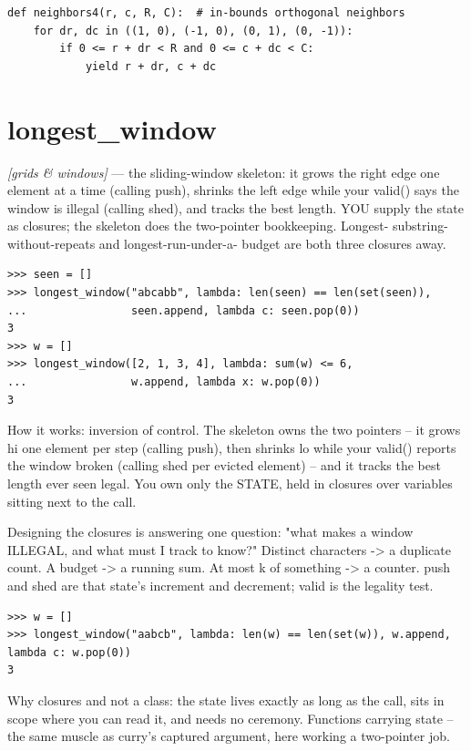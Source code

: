 \documentclass[11pt,letterpaper]{book}
\begin{document}
\begin{lstlisting}[style=code]
def neighbors4(r, c, R, C):  # in-bounds orthogonal neighbors
    for dr, dc in ((1, 0), (-1, 0), (0, 1), (0, -1)):
        if 0 <= r + dr < R and 0 <= c + dc < C:
            yield r + dr, c + dc
\end{lstlisting}

\section{longest\_window}
\noindent\textit{[grids \& windows]} --- the sliding-window skeleton: it grows the right edge one element at a time (calling push), shrinks the left edge while your valid() says the window is illegal (calling shed), and tracks the best length. YOU supply the state as closures; the skeleton does the two-pointer bookkeeping. Longest- substring-without-repeats and longest-run-under-a- budget are both three closures away.
\begin{lstlisting}[style=spec]
>>> seen = []
>>> longest_window("abcabb", lambda: len(seen) == len(set(seen)),
...                seen.append, lambda c: seen.pop(0))
3
>>> w = []
>>> longest_window([2, 1, 3, 4], lambda: sum(w) <= 6,
...                w.append, lambda x: w.pop(0))
3
\end{lstlisting}

How it works: inversion of control. The skeleton owns the two pointers -- it grows hi one element per step (calling push), then shrinks lo while your valid() reports the window broken (calling shed per evicted element) -- and it tracks the best length ever seen legal. You own only the STATE, held in closures over variables sitting next to the call.


Designing the closures is answering one question: "what makes a window ILLEGAL, and what must I track to know?" Distinct characters -> a duplicate count. A budget -> a running sum. At most k of something -> a counter. push and shed are that state's increment and decrement; valid is the legality test.

\begin{lstlisting}[style=spec]
>>> w = []
>>> longest_window("aabcb", lambda: len(w) == len(set(w)), w.append, lambda c: w.pop(0))
3
\end{lstlisting}

Why closures and not a class: the state lives exactly as long as the call, sits in scope where you can read it, and needs no ceremony. Functions carrying state -- the same muscle as curry's captured argument, here working a two-pointer job.
\end{document}
